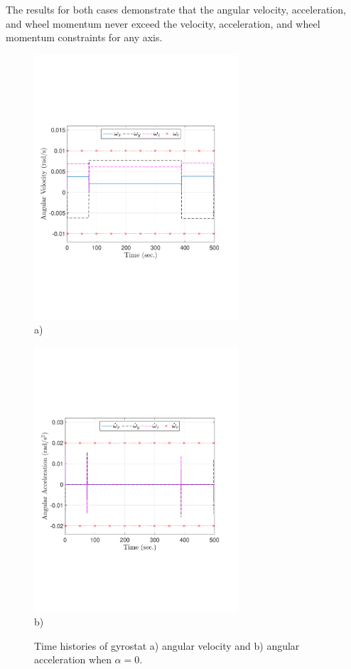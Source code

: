 \documentclass[journal ]{new-aiaa}
\begin{document}
The results for both cases demonstrate that the angular velocity, acceleration, and wheel momentum never exceed the velocity, acceleration, and wheel momentum constraints for any axis.
\begin{figure}[htb!]
    \centering
    \begin{minipage}{.5\textwidth}
        \centering
  \includegraphics[width=3in]{total_angular_velocity_alpha0}
  		\\ a) 
    \end{minipage}%
    \begin{minipage}{0.5\textwidth}
        \centering
       \includegraphics[width=3in]{total_angular_acceleration_alpha0}
       \\ b) 
    \end{minipage}
    \caption{Time histories of gyrostat a) angular velocity and b) angular acceleration when $\alpha=0$.}
    \label{fig:ang_vel_acc0} 
\end{figure}
\end{document}
